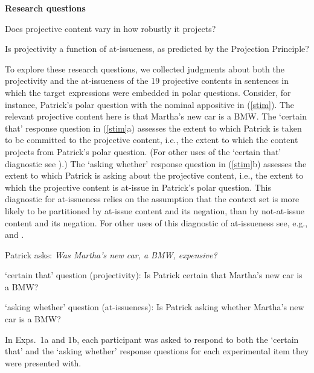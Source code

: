 \documentclass[11pt,fleqn]{article}
\newcommand{\6}{\mbox{$[\hspace*{-.6mm}[$}}
\newcommand{\9}{\mbox{$]\hspace*{-.6mm}]$}}
\begin{document}
\begin{exe}
\ex\label{questions} {\bf Research questions}

\begin{xlist} 

\ex Does projective content vary in how robustly it projects?

\ex Is projectivity a function of at-issueness, as predicted by the Projection Principle?
\end{xlist}

\end{exe} 
To explore these research questions, we collected judgments about both the projectivity and the at-issueness of the 19 projective contents in sentences in which the target expressions were embedded in polar questions. Consider, for instance, Patrick's polar question with the nominal appositive in (\ref{stim}). The relevant projective content here is that Martha's new car is a BMW. The `certain that' response question in (\ref{stim}a) assesses the extent to which Patrick is taken to be committed to the projective content, i.e., the extent to which the content projects from Patrick's polar question. (For other uses of the `certain that' diagnostic see \citealt{tonhauser-salt26,stevens-etal2017}).) The `asking whether' response question in (\ref{stim}b) assesses the extent to which Patrick is asking about the projective content, i.e., the extent to which the projective content is at-issue in Patrick's polar question. This diagnostic for at-issueness relies on the assumption that the context set is more likely to be partitioned by at-issue content and its negation, than by not-at-issue content and its negation. For other uses of this diagnostic of at-issueness see, e.g., \citealt{amaral-etal07} and \citealt{tonhauser-sula6}.

\begin{exe}

\ex\label{stim} Patrick asks: {\em Was Martha's new car, a BMW, expensive?} 

\begin{xlist}
\ex `certain that' question (projectivity): Is Patrick certain that Martha's new car is a BMW?

\ex `asking whether' question (at-issueness): Is Patrick asking whether Martha's new car is a BMW?

\end{xlist}

\end{exe}
In Exps.~1a and 1b, each participant was asked to respond to both the `certain that'  and the `asking whether' response questions for each experimental item they were presented with.
\end{document}
